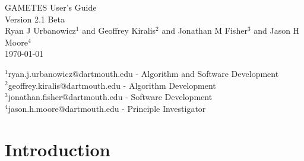 \documentclass{report}
\begin{document}
\begin{titlepage}
\begin{center}
{ \vspace*{3cm} }
{\Huge GAMETES User's Guide}\\[0.5cm]
{\LARGE Version 2.1 Beta}\\[1.5cm]
{\large Ryan J Urbanowicz$^1$ and Geoffrey Kiralis$^2$ and Jonathan M Fisher$^3$ and Jason H Moore$^4$}\\[0.5cm]
{\large \today}\\
\vfill
\end{center}
\begin{flushleft}
$^1$ryan.j.urbanowicz@dartmouth.edu - Algorithm and Software Development\\
$^2$geoffrey.kiralis@dartmouth.edu - Algorithm Development\\
$^3$jonathan.fisher@dartmouth.edu - Software Development\\
$^4$jason.h.moore@dartmouth.edu - Principle Investigator
\end{flushleft}
\end{titlepage}

\newpage
{}
\tableofcontents

\newpage


\chapter{Introduction}   
\end{document}
